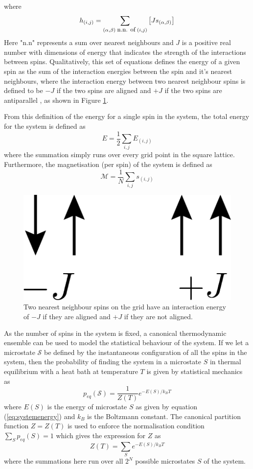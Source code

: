 \documentclass[11pt]{iopart}
\begin{document}
where
\begin{equation}
h_{(i, j)} = \sum_{(\alpha, \beta) \; \textrm{\small{n.n. of}} \; (i, j)} \left[ J  s_{(\alpha, \beta)} \right]
\end{equation}
Here "n.n" represents a sum over nearest neighbours and $J$ is a positive real number with dimensions of energy that indicates the strength of the interactions between spins. Qualitatively, this set of equations defines the energy of a given spin as the sum of the interaction energies between the spin and it's nearest neighbours, where the interaction energy between two nearest neighbour spins is defined to be $-J$ if the two spins are aligned and $+J$ if the two spins are antiparallel \cite{handout}, as shown in Figure \ref{fig:spinalignment}.

From this definition of the energy for a single spin in the system, the total energy for the system is defined as
\begin{equation}
\label{eq:systemenergy}
E = \frac{1}{2} \sum_{i, j} E_{(i, j)}
\end{equation}
where the summation simply runs over every grid point in the square lattice.
Furthermore, the magnetisation (per spin) of the system is defined as
\begin{equation}
\mathcal{M} = \frac{1}{N} \sum_{i, j} s_{(i, j)}
\end{equation}

\begin{figure}[t]
  \centering
  \includegraphics[width=0.14\linewidth]{images/spins/4x/spins@4x.png}
  \caption{Two nearest neighbour spins on the grid have an interaction energy of $-J$ if they are aligned and $+J$ if they are not aligned.}
  \label{fig:spinalignment}
\end{figure}

As the number of spins in the system is fixed, a canonical thermodynamic ensemble can be used to model the statistical behaviour of the system. If we let a microstate $\mathcal{S}$ be defined by the instantaneous configuration of all the spins in the system, then the probability of finding the system in a microstate $S$ in thermal equilibrium with a heat bath at temperature $T$ is given by statistical mechanics as \cite{statmech} \cite{handout}
\begin{equation}
\label{eq:probabilitydist}
p_{eq}(\mathcal{S}) = \frac{1}{Z(T)} e^{-E(S)/k_B T}
\end{equation}
where $E(S)$ is the energy of microstate $S$ as given by equation (\ref{eq:systemenergy}) and $k_B$ is the Boltzmann constant. The canonical partition function $Z = Z(T)$ is used to enforce the normalisation condition $\sum_S{p_{eq}(S)} = 1$ which gives the expression for $Z$ as
\begin{equation}
Z(T) = \sum_{S} e^{-E(S)/k_B T}
\end{equation}
where the summations here run over all $2^N$ possible microstates $S$ of the system.
\end{document}

